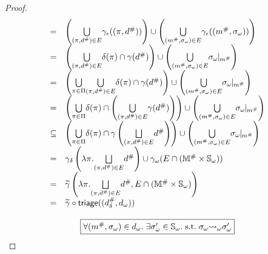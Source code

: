 \begin{proof}
\[\begin{array}{cl}
      =& \left( \underset{(\view, \abselem) \in E}{\bigcup} \aelemgamma((\view,
      \abselem)) \right) \cup \left( \underset{(\absimap, \symbst) \in
    E}{\bigcup} \aelemgamma((\absimap, \symbst)) \right)\\

      =& \left( \underset{(\view, \abselem) \in E}{\bigcup} \viewmap(\view) \cap
      \gamma(\abselem) \right) \cup \left( \underset{(\absimap, \symbst) \in
      E}{\bigcup} \instant{\symbst}{\absimap} \right)\\

      =& \left( \underset{\view \in \viewset}{\bigcup} { \underset{(\view,
      \abselem) \in E}{\bigcup} \viewmap(\view) \cap \gamma(\abselem) } \right)
      \cup \left( \underset{(\absimap, \symbst) \in E}{\bigcup}
      \instant{\symbst}{\absimap} \right)\\

      =& \left( \underset{\view \in \viewset}{\bigcup} {\viewmap(\view) \cap
        \left(\underset{(\view, \abselem) \in
      E}{\bigcup}{\gamma(\abselem)}\right)} \right) \cup \left(
      \underset{(\absimap, \symbst) \in E}{\bigcup} \instant{\symbst}{\absimap}
      \right)\\

      \subseteq& \left( \underset{\view \in \viewset}{\bigcup} {\viewmap(\view)
        \cap \gamma\left( \underset{(\view, \abselem) \in E}{\bigjoin}\abselem
      \right)} \right) \cup \left( \underset{(\absimap, \symbst) \in E}{\bigcup}
      \instant{\symbst}{\absimap} \right)\\

      =& \sgamma\left( \lambda \view. \underset{(\view, \abselem) \in
      E}{\bigjoin}\abselem \right) \cup \symbgamma(E \cap (\absimapset \times
      \symbstset))\\

      =& \combgamma\left( \lambda \view. \underset{(\view, \abselem) \in
      E}{\bigjoin}\abselem, E \cap (\absimapset \times \symbstset) \right)\\

      =& \combgamma \circ \triage((\sabselem, \symbelem))\\
    \end{array}
  \]
  \[\]
  \[
    \fbox{$\forall ({m}^{\#}, {\sigma}_\omega) \in {d}_\omega. \; \exists {\sigma}_\omega' \in
    {\mathbb{S}}_\omega.  \; \text{s.t.} \; {\sigma}_\omega {\leadsto}_\omega {\sigma}_\omega'$}
  \]


\end{proof}
